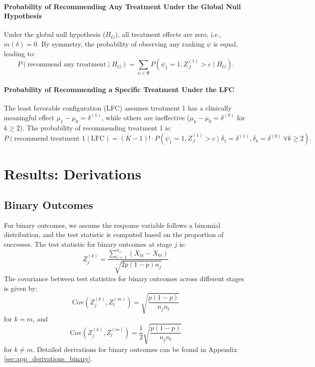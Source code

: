 \documentclass[11pt, a4paper]{article}\usepackage[]{graphicx}\usepackage[]{xcolor}
\begin{document}
\paragraph{Probability of Recommending Any Treatment Under the Global Null Hypothesis}
Under the global null hypothesis ($H_G$), all treatment effects are zero, i.e., $m(\delta) = 0$. By symmetry, the probability of observing any ranking $\psi$ is equal, leading to:
\[
P(\text{recommend any treatment} \mid H_G) = \sum_{\psi \in \Psi} P(\psi_1 = 1, Z_J^{(1)} > c \mid H_G).
\]

\paragraph{Probability of Recommending a Specific Treatment Under the LFC}
The least favorable configuration (LFC) assumes treatment 1 has a clinically meaningful effect $\mu_1 - \mu_0 = \delta^{(1)}$, while others are ineffective ($\mu_k - \mu_0 = \delta^{(0)}$ for $k \geq 2$). The probability of recommending treatment 1 is:
\[
P(\text{recommend treatment 1} \mid \text{LFC}) = (K-1)! \cdot P(\psi_1 = 1, Z_J^{(1)} > c \mid \delta_1 = \delta^{(1)}, \delta_k = \delta^{(0)} \ \forall k \geq 2).
\]




\newpage
\section{Results: Derivations} \label{sec:results_derivation}

\subsection{Binary Outcomes}
For binary outcomes, we assume the response variable follows a binomial distribution, and the test statistic is computed based on the proportion of successes. The test statistic for binary outcomes at stage $j$ is:
\begin{equation}
Z_j^{(k)} = \frac{\sum_{i=1}^{n_j} (X_{ki} - X_{0i})}{\sqrt{2p(1 - p) n_j}}
\end{equation}
The covariance between test statistics for binary outcomes across different stages is given by:
\begin{equation}
\text{Cov}(Z_j^{(k)}, Z_l^{(m)}) = \sqrt{\frac{p(1 - p)}{n_j n_l}} \label{eq:bin_covariance1}
\end{equation}
for $k = m$, and
\begin{equation}
\text{Cov}(Z_j^{(k)}, Z_l^{(m)}) = \frac{1}{2} \sqrt{\frac{p(1 - p)}{n_j n_l}}
\end{equation}
for $k \neq m$. Detailed derivations for binary outcomes can be found in Appendix \ref{sec:app_derivations_binary}.
\end{document}
